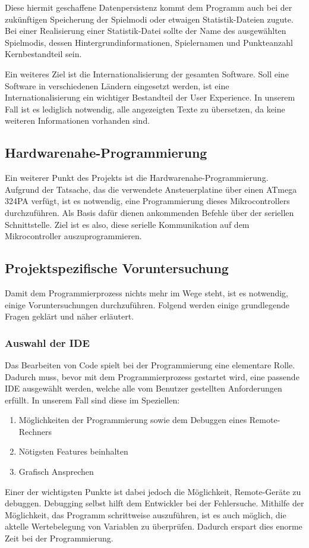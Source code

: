 Diese hiermit geschaffene Datenpersistenz kommt dem Programm auch bei der zukünftigen Speicherung der Spielmodi oder etwaigen Statistik-Dateien zugute.
Bei einer Realisierung einer Statistik-Datei sollte der Name des ausgewählten Spielmodis, dessen Hintergrundinformationen, Spielernamen und Punkteanzahl Kernbestandteil sein.

Ein weiteres Ziel ist die Internationalisierung der gesamten Software.
Soll eine Software in verschiedenen Ländern eingesetzt werden, ist eine Internationalisierung ein wichtiger Bestandteil der User Experience.
In unserem Fall ist es lediglich notwendig, alle angezeigten Texte zu übersetzen, da keine weiteren Informationen vorhanden sind.

\subsection{Hardwarenahe-Programmierung}\label{subsec:hardwarenahe-programmierung}
Ein weiterer Punkt des Projekts ist die Hardwarenahe-Programmierung.
Aufgrund der Tatsache, das die verwendete Ansteuerplatine über einen ATmega 324PA verfügt, ist es notwendig, eine Programmierung dieses Mikrocontrollers durchzuführen.
Als Basis dafür dienen ankommenden Befehle über der seriellen Schnittstelle.
Ziel ist es also, diese serielle Kommunikation auf dem Mikrocontroller auszuprogrammieren.

\subsection{Projektspezifische Voruntersuchung}\label{subsec:projektspezifische-voruntersuchung}
Damit dem Programmierprozess nichts mehr im Wege steht, ist es notwendig, einige Voruntersuchungen durchzuführen.
Folgend werden einige grundlegende Fragen geklärt und näher erläutert.
\subsubsection{Auswahl der IDE}
Das Bearbeiten von Code spielt bei der Programmierung eine elementare Rolle.
Dadurch muss, bevor mit dem Programmierprozess gestartet wird, eine passende IDE ausgewählt werden, welche alle vom Benutzer gestellten Anforderungen erfüllt.
In unserem Fall sind diese im Speziellen:
\begin{enumerate}
    \item Möglichkeiten der Programmierung sowie dem Debuggen eines Remote-Rechners
    \item Nötigsten Features beinhalten
    \item Grafisch Ansprechen
\end{enumerate}
Einer der wichtigsten Punkte ist dabei jedoch die Möglichkeit, Remote-Geräte zu debuggen.
Debugging selbst hilft dem Entwickler bei der Fehlersuche.
Mithilfe der Möglichkeit, das Programm schrittweise auszuführen, ist es auch möglich, die aktelle Wertebelegung von Variablen zu überprüfen.
Dadurch erspart dies enorme Zeit bei der Programmierung.

